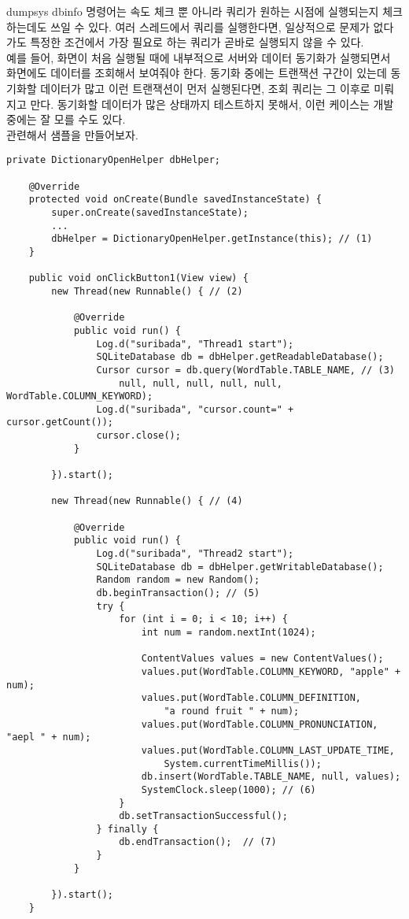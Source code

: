 dumpsys dbinfo 명령어는 속도 체크 뿐 아니라 쿼리가 원하는 시점에 실행되는지 체크하는데도 쓰일 수 있다.
여러 스레드에서 쿼리를 실행한다면, 일상적으로 문제가 없다가도 특정한 조건에서 가장 필요로 하는 쿼리가 곧바로 실행되지 않을 수 있다.\\

예를 들어, 화면이 처음 실행될 때에 내부적으로 서버와 데이터 동기화가 실행되면서 화면에도 데이터를 조회해서 보여줘야 한다. 
동기화 중에는 트랜잭션 구간이 있는데 동기화할 데이터가 많고 이런 트랜잭션이 먼저 실행된다면, 조회 쿼리는 그 이후로 미뤄지고 만다. 
동기화할 데이터가 많은 상태까지 테스트하지 못해서, 이런 케이스는 개발 중에는 잘 모를 수도 있다.\\

관련해서 샘플을 만들어보자.
\begin{lstlisting}[frame=single] 
	private DictionaryOpenHelper dbHelper;

	@Override
	protected void onCreate(Bundle savedInstanceState) {
		super.onCreate(savedInstanceState);
		...
		dbHelper = DictionaryOpenHelper.getInstance(this); // (1)
	}

	public void onClickButton1(View view) {
		new Thread(new Runnable() { // (2)

			@Override
			public void run() {
				Log.d("suribada", "Thread1 start");
				SQLiteDatabase db = dbHelper.getReadableDatabase();
				Cursor cursor = db.query(WordTable.TABLE_NAME, // (3)
					null, null, null, null, null, WordTable.COLUMN_KEYWORD);
				Log.d("suribada", "cursor.count=" + cursor.getCount());
				cursor.close();
			}

		}).start();
		
		new Thread(new Runnable() { // (4)

			@Override
			public void run() {
				Log.d("suribada", "Thread2 start");
				SQLiteDatabase db = dbHelper.getWritableDatabase();
				Random random = new Random();
				db.beginTransaction(); // (5)
				try {
					for (int i = 0; i < 10; i++) {
						int num = random.nextInt(1024);

						ContentValues values = new ContentValues();
						values.put(WordTable.COLUMN_KEYWORD, "apple" + num);
						values.put(WordTable.COLUMN_DEFINITION, 
							"a round fruit " + num);
						values.put(WordTable.COLUMN_PRONUNCIATION, "aepl " + num);
						values.put(WordTable.COLUMN_LAST_UPDATE_TIME,
							System.currentTimeMillis());
						db.insert(WordTable.TABLE_NAME, null, values);
						SystemClock.sleep(1000); // (6)
					}
					db.setTransactionSuccessful();
				} finally {
					db.endTransaction();  // (7)
				}
			}

		}).start();
	}
\end{lstlisting}	

